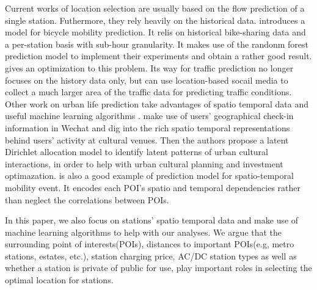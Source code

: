 Current works of location selection are usually based on the flow prediction of a single station. Futhermore, they rely heavily on the historical data. \cite{Yang:2016:MMP} introduces a model for bicycle mobility prediction. It relis on historical bike-sharing data and a per-station basis with sub-hour granularity. It makes use of the randonm forest prediction model to implement their experiments and obtain a rather good result. \cite{Liu:2016:CTP} gives an optimization to this problem. Its way for traffic prediction no longer focuses on the history data only, but can use location-based socail media to collect a much larger area of the traffic data for predicting traffic conditions. Other work on urban life prediction take advantages of spatio temporal data and useful machine learning algorithms \cite{Hoang:2016,Li:2018,Liao:2018:DSL:3219819.3219895,Liu:2016:CTP,Shen:2018:SNS,Zhou:2018:DLP:3219819.3219929}. \cite{Zhou:2018:DLP:3219819.3219929} make use of users' geographical check-in information in Wechat and dig into the rich spatio temporal representations behind users' activity at cultural venues. Then the authors propose a latent Dirichlet allocation model to identify latent patterns of urban cultural interactions, in order to help with urban cultural planning and investment optimazation. \cite{Shen:2018:SNS} is also a good example of prediction model for spatio-temporal mobility event. It encodes each POI's spatio and temporal dependencies rather than neglect the correlations between POIs. 

In this paper, we also focus on stations' spatio temporal data and make use of machine learning algorithms to help with our analyses. We argue that the surrounding point of interests(POIs), distances to important POIs(e.g, metro stations, estates, etc.), station charging price, AC/DC station types as well as whether a station is private of public for use, play important roles in selecting the optimal location for stations.

